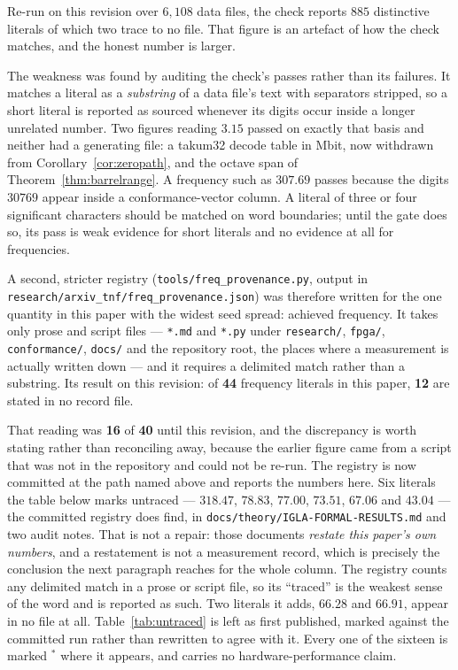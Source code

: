 \documentclass[11pt]{article}
\theoremstyle{definition}
\begin{document}
Re-run on this revision over $6{,}108$ data files, the check reports $885$
distinctive literals of which two trace to no file. That figure is an artefact of
how the check matches, and the honest number is larger.

The weakness was found by auditing the check's passes rather than its failures. It
matches a literal as a \emph{substring} of a data file's text with separators
stripped, so a short literal is reported as sourced whenever its digits occur
inside a longer unrelated number. Two figures reading $3.15$ passed on exactly that
basis and neither had a generating file: a takum32 decode table in Mbit, now
withdrawn from Corollary~\ref{cor:zeropath}, and the octave span of
Theorem~\ref{thm:barrelrange}. A frequency such as $307.69$ passes because the
digits $30769$ appear inside a conformance-vector column. A literal of three or
four significant characters should be matched on word boundaries; until the gate
does so, its pass is weak evidence for short literals and no evidence at all for
frequencies.

A second, stricter registry (\texttt{tools/}\allowbreak\texttt{freq\_provenance.py},
output in \texttt{research/}\allowbreak\texttt{arxiv\_tnf/}\allowbreak\texttt{freq\_provenance.json}) was therefore written for the
one quantity in this paper with the widest seed spread: achieved frequency. It
takes only prose and script files --- \texttt{*.md} and \texttt{*.py} under
\texttt{research/}, \texttt{fpga/}, \texttt{conformance/}, \texttt{docs/} and the
repository root, the places where a measurement is actually written down --- and it
requires a delimited match rather than a substring. Its result on this revision:
of \textbf{44} frequency literals in this paper, \textbf{12} are stated in no
record file.

That reading was \textbf{16} of \textbf{40} until this revision, and the
discrepancy is worth stating rather than reconciling away, because the earlier
figure came from a script that was not in the repository and could not be re-run.
The registry is now committed at the path named above and reports the numbers
here. Six literals the table below marks untraced --- $318.47$, $78.83$, $77.00$,
$73.51$, $67.06$ and $43.04$ --- the committed registry does find, in
\texttt{docs/theory/}\allowbreak\texttt{IGLA-FORMAL-RESULTS.md} and two audit
notes. That is not a repair: those documents \emph{restate this paper's own
numbers}, and a restatement is not a measurement record, which is precisely the
conclusion the next paragraph reaches for the whole column. The registry counts
any delimited match in a prose or script file, so its ``traced'' is the weakest
sense of the word and is reported as such. Two literals it adds, $66.28$ and
$66.91$, appear in no file at all. Table~\ref{tab:untraced} is left as first
published, marked against the committed run rather than rewritten to agree with
it. Every one of the sixteen is
marked $^{\ast}$ where it appears, and
carries no hardware-performance claim.
\end{document}
